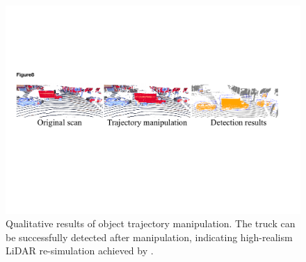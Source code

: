 \begin{figure}[t]
    \centering
    \includegraphics[width=0.8\columnwidth]{Figures/trajectory_manipulation.pdf}
    \caption{Qualitative results of object trajectory manipulation. The truck can be successfully detected after manipulation, indicating high-realism LiDAR re-simulation achieved by \dynfl.}
    \label{fig:traj}
    
\end{figure}